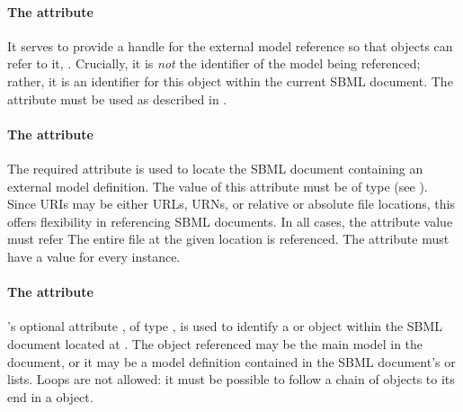\paragraph{The \fixttspace{} attribute}

  It serves to provide a handle for the external model reference so that \Submodel objects can refer to it, .  Crucially, it is \emph{not} the identifier of the model being referenced; rather, it is an identifier for this \ExternalModelDefinition object within the current SBML document.  The  attribute must be used as described in .


\paragraph{The \fixttspace{} attribute}

The required attribute  is used to locate the SBML document containing an external model definition.  The value of this attribute must be of type  (see ). Since URIs may be either URLs, URNs, or relative or absolute file locations, this offers flexibility in referencing SBML documents.  In all cases, the  attribute value must refer   The entire file at the given location is referenced.  The  attribute must have a value for every \ExternalModelDefinition instance.

\paragraph{The \fixttspace{} attribute}

\ExternalModelDefinition's optional attribute , of type , is used to identify a \Model or \ExternalModelDefinition object within the SBML document located at .  The object referenced may be the main model in the document, or it may be a model definition contained in the SBML document's  or  lists.  Loops are not allowed: it must be possible to follow a chain of \ExternalModelDefinition objects to its end in a \Model object.

